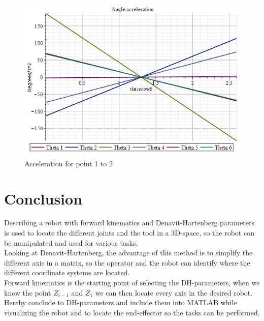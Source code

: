 \begin{figure}[H]
  \centering
  \begin{minipage}[b]{0.45\textwidth}
    \includegraphics[width=\textwidth]{Design/acccb.png}
    \caption{Acceleration for point 1 to 2}
    \label{fig:acceleration}
   \end{minipage}
\end{figure}
 
\section{Conclusion}
Describing a robot with forward kinematics and Denavit-Hartenberg parameters is used to locate the different joints and the tool in a 3D-space, so the robot can be manipulated and used for various tasks.\\
Looking at Denavit-Hartenberg, the advantage of this method is to simplify the different axis in a matrix, so the operator and the robot can identify where the different coordinate systems are located.\\
Forward kinematics is the starting point of selecting the DH-parameters, when we know the point $Z_{i-1}$ and $Z_1$ we can then locate every axis in the desired robot. Hereby conclude to DH-parameters and include them into MATLAB while visualizing the robot and to locate the end-effector so the tasks can be performed.\\






